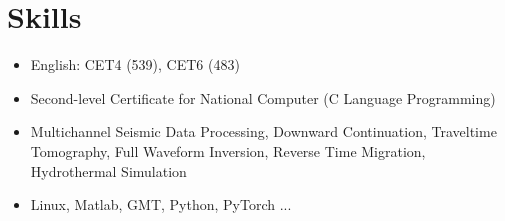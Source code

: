 \section{Skills}

\begin{itemize}
      \item English: CET4 (539), CET6 (483)
      \item Second-level Certificate for National Computer (C Language Programming)
      \item Multichannel Seismic Data Processing, Downward Continuation, Traveltime Tomography, Full Waveform Inversion, Reverse Time Migration, Hydrothermal Simulation 
      \item Linux, Matlab, GMT, Python, PyTorch ...
      \end{itemize}
